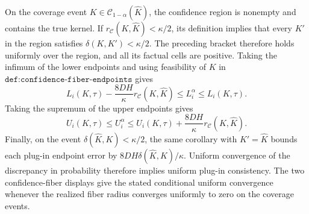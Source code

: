 On the coverage event \(K\in\mathcal C_{1-\alpha}(\widehat K)\), the confidence region is nonempty and contains the true kernel.  If \(r_{\mathcal C}(K,\widehat K)<\kappa/2\), its definition implies that every \(K'\) in the region satisfies \(\delta(K,K')<\kappa/2\).  The preceding bracket therefore holds uniformly over the region, and all its factual cells are positive.  Taking the infimum of the lower endpoints and using feasibility of \(K\) in \(\texttt{def:confidence-fiber-endpoints}\) gives
\[
 L_i(K,\tau)-\frac{8DH}{\kappa}r_{\mathcal C}(K,\widehat K)
 \le L_i^\alpha\le L_i(K,\tau).
\]
Taking the supremum of the upper endpoints gives
\[
 U_i(K,\tau)
 \le U_i^\alpha
 \le U_i(K,\tau)+\frac{8DH}{\kappa}r_{\mathcal C}(K,\widehat K).
\]
Finally, on the event \(\delta(\widehat K,K)<\kappa/2\), the same corollary with \(K'=\widehat K\) bounds each plug-in endpoint error by \(8DH\delta(\widehat K,K)/\kappa\).  Uniform convergence of the discrepancy in probability therefore implies uniform plug-in consistency.  The two confidence-fiber displays give the stated conditional uniform convergence whenever the realized fiber radius converges uniformly to zero on the coverage events.